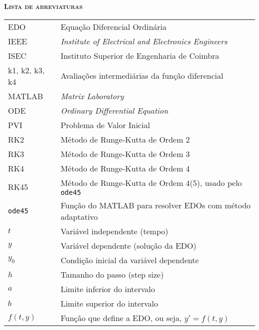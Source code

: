 
\vspace*{45pt}
\begin{flushleft}
	{\Large \textbf{\scshape{Lista de abreviaturas}}}
\end{flushleft}
\vspace*{20pt}

\begin{tabular}{l l}
EDO     & Equação Diferencial Ordinária \\
IEEE	& \textit{Institute of Electrical and Electronics Engineers} \\
ISEC    & Instituto Superior de Engenharia de Coimbra \\
k1, k2, k3, k4 & Avaliações intermediárias da função diferencial \\
MATLAB  & \textit{Matrix Laboratory} \\
ODE     & \textit{Ordinary Differential Equation} \\
PVI     & Problema de Valor Inicial \\
RK2     & Método de Runge-Kutta de Ordem 2 \\
RK3     & Método de Runge-Kutta de Ordem 3 \\
RK4     & Método de Runge-Kutta de Ordem 4 \\
RK45    & Método de Runge-Kutta de Ordem 4(5), usado pelo \texttt{ode45} \\
\texttt{ode45} & Função do MATLAB para resolver EDOs com método adaptativo \\
$t$      & Variável independente (tempo) \\
$y$      & Variável dependente (solução da EDO) \\
$y_0$    & Condição inicial da variável dependente \\
$h$      & Tamanho do passo (step size) \\
$a$      & Limite inferior do intervalo \\
$b$      & Limite superior do intervalo \\
$f(t, y)$ & Função que define a EDO, ou seja, $y' = f(t, y)$ \\
\end{tabular}
